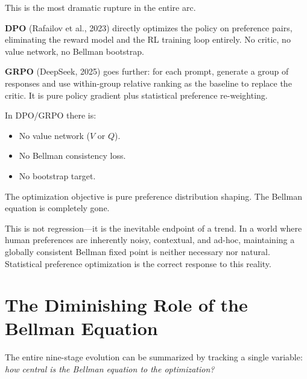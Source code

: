 This is the most dramatic rupture in the entire arc.

\textbf{DPO} (Rafailov et al., 2023) directly optimizes the policy on preference pairs, eliminating the reward model and the RL training loop entirely.
No critic, no value network, no Bellman bootstrap.

\textbf{GRPO} (DeepSeek, 2025) goes further: for each prompt, generate a group of responses and use within-group relative ranking as the baseline to replace the critic.
It is pure policy gradient plus statistical preference re-weighting.

\begin{keyidea}
In DPO/GRPO there is:
\begin{itemize}
    \item No value network ($V$ or $Q$).
    \item No Bellman consistency loss.
    \item No bootstrap target.
\end{itemize}
The optimization objective is pure preference distribution shaping.
The Bellman equation is completely gone.
\end{keyidea}

This is not regression---it is the inevitable endpoint of a trend.
In a world where human preferences are inherently noisy, contextual, and ad-hoc, maintaining a globally consistent Bellman fixed point is neither necessary nor natural.
Statistical preference optimization is the correct response to this reality.

\section{The Diminishing Role of the Bellman Equation}
\label{sec:bellman-role}

The entire nine-stage evolution can be summarized by tracking a single variable: \emph{how central is the Bellman equation to the optimization?}

